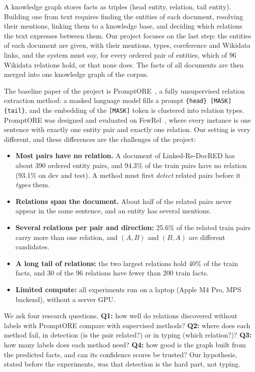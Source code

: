 \documentclass[pdflatex,sn-mathphys-num]{sn-jnl}
\begin{document}
A knowledge graph stores facts as triples (head entity, relation, tail entity). Building one from text requires finding the entities of each document, resolving their mentions, linking them to a knowledge base, and deciding which relations the text expresses between them. Our project focuses on the last step: the entities of each document are given, with their mentions, types, coreference and Wikidata links, and the system must say, for every ordered pair of entities, which of 96 Wikidata relations hold, or that none does. The facts of all documents are then merged into one knowledge graph of the corpus.

The baseline paper of the project is PromptORE~\cite{genest2023promptore}, a fully unsupervised relation extraction method: a masked language model fills a prompt \texttt{\{head\} [MASK] \{tail\}}, and the embedding of the \texttt{[MASK]} token is clustered into relation types. PromptORE was designed and evaluated on FewRel~\cite{han2018fewrel}, where every instance is one sentence with exactly one entity pair and exactly one relation. Our setting is very different, and these differences are the challenges of the project:

\begin{itemize}
\item \textbf{Most pairs have no relation.} A document of Linked-Re-DocRED has about 390 ordered entity pairs, and 94.3\% of the train pairs have no relation (93.1\% on dev and test). A method must first \emph{detect} related pairs before it \emph{types} them.
\item \textbf{Relations span the document.} About half of the related pairs never appear in the same sentence, and an entity has several mentions.
\item \textbf{Several relations per pair and direction:} 25.6\% of the related train pairs carry more than one relation, and $(A,B)$ and $(B,A)$ are different candidates.
\item \textbf{A long tail of relations:} the two largest relations hold 40\% of the train facts, and 30 of the 96 relations have fewer than 200 train facts.
\item \textbf{Limited compute:} all experiments run on a laptop (Apple M4 Pro, MPS backend), without a server GPU.
\end{itemize}

We ask four research questions. \textbf{Q1:} how well do relations discovered without labels with PromptORE compare with supervised methods? \textbf{Q2:} where does each method fail, in detection (is the pair related?) or in typing (which relation?)? \textbf{Q3:} how many labels does each method need? \textbf{Q4:} how good is the graph built from the predicted facts, and can its confidence scores be trusted? Our hypothesis, stated before the experiments, was that detection is the hard part, not typing.
\end{document}

